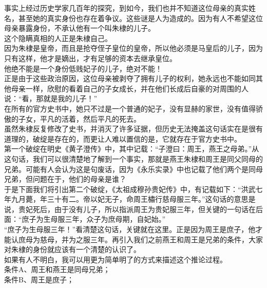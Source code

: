 \begin{multicols}{\theparacolNo}
事实上经过历史学家几百年的探究，到如今，我们也并不知道这位母亲的真实姓名，甚至她的真实身份也存在着争议。这些谜是人为造成的。因为有人不希望这位母亲暴露身份，不承认他有一个叫朱棣的儿子。\\

这个隐瞒真相的人正是朱棣自己。\\

因为朱棣是皇帝，而且是抢夺侄子皇位的皇帝，所以他必须是马皇后的儿子，因为只有这样，他才是嫡出，才有足够的资本去继承皇位。\\

他绝不能是一个身份低贱妃子的儿子，绝对不能！\\

正是由于这些政治原因，这位母亲被剥夺了拥有儿子的权利，她永远也不能如同其他母亲一样，欣慰的看着自己的子女成长，并在他们长成后自豪的对周围的人说：“看，那就是我的儿子！”\\

在所有的官方史书中，她只不过是一个普通的妃子，没有显赫的家世，没有值得骄傲的子女，平凡的活着，然后平凡的死去。\\

虽然朱棣反复修改了史书，并消灭了许多证据，但历史无法掩盖这句话实在是很有道理的，破绽是存在的，而更让人难以置信的是，它就存在于官方史书中。\\

第一个破绽在明史《黄子澄传》中，其中记载：“子澄曰：周王，燕王之母弟。”从这句话，我们可以很清楚地了解到一个事实，那就是燕王朱棣和周王是同父同母的兄弟。可能有人会认为这是句废话，因为《永乐实录》中也记载了他们两个是同母兄弟，但问题在于，他们的母亲是谁？\\

于是下面我们将引出第二个破绽，《太祖成穆孙贵妃传》中，有记载如下：“洪武七年九月薨，年三十有二。帝以妃无子，命周王橚行慈母服三年。”这句话的意思是说，贵妃死后，由于没有儿子，所以指派周王为贵妃服三年，但关键的一句话在后面：“庶子为生母服三年，众子为庶母期，自妃始。”\\

“庶子为生母服三年！”看清楚这句话，关键就在这里。正是因为周王是庶子，他才能认庶母为慈母，并为之服三年。再引入我们之前燕王和周王是兄弟的条件，大家对朱棣的身份就应该有一个清楚的认识了。\\

如果有人不明白，我可以用更为简单明了的方式来描述这个推论过程。\\

条件A、周王和燕王是同母兄弟；\\

条件B、周王是庶子；\\


\end{multicols}
